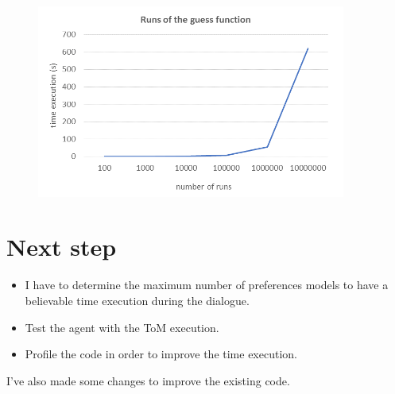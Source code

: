 \documentclass{llncs}
\begin{document}
		 \begin{figure} [h]
		 	\centerline{\includegraphics[width=4in]{figs/graph.png}}
		 	\vskip 8pt
		 \end{figure}

 
 \section{Next step}
 \begin{itemize}
	\item   I have to determine the maximum number of preferences models to have a believable time execution during the dialogue.
	\item Test the agent with the ToM execution.
	\item Profile the code in order to improve the time execution.
 \end{itemize}
 
 I've also made some changes to improve the existing code. 

%
%

\
\end{document}
